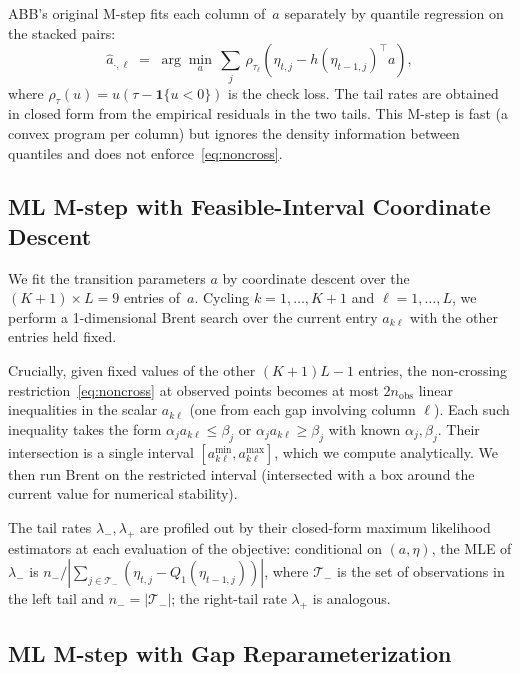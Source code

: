 \documentclass[12pt]{article}
\begin{document}
ABB's original M-step fits each column of~$a$ separately by quantile regression on the stacked pairs:
\[
\widehat{a}_{\cdot,\ell} \;=\; \arg\min_{a}\, \sum_{j}\, \rho_{\tau_{\ell}}\!\left(\eta_{t,j} - h(\eta_{t-1,j})^{\top} a\right),
\]
where $\rho_{\tau}(u) = u(\tau - \mathbf{1}\{u < 0\})$ is the check loss. The tail rates are obtained in closed form from the empirical residuals in the two tails. This M-step is fast (a convex program per column) but ignores the density information between quantiles and does not enforce~\eqref{eq:noncross}.

\subsection{ML M-step with Feasible-Interval Coordinate Descent}
\label{sec:approachA}

We fit the transition parameters $a$ by coordinate descent over the $(K+1) \times L = 9$ entries of~$a$. Cycling $k = 1, \dots, K+1$ and $\ell = 1, \dots, L$, we perform a 1-dimensional Brent search over the current entry $a_{k\ell}$ with the other entries held fixed.

Crucially, given fixed values of the other $(K+1) L - 1$ entries, the non-crossing restriction~\eqref{eq:noncross} at observed points becomes at most $2 n_{\mathrm{obs}}$ linear inequalities in the scalar $a_{k\ell}$ (one from each gap involving column $\ell$). Each such inequality takes the form $\alpha_{j} a_{k\ell} \leq \beta_{j}$ or $\alpha_{j} a_{k\ell} \geq \beta_{j}$ with known $\alpha_{j}, \beta_{j}$. Their intersection is a single interval $[a_{k\ell}^{\min}, a_{k\ell}^{\max}]$, which we compute analytically. We then run Brent on the restricted interval (intersected with a box around the current value for numerical stability).

The tail rates $\lambda_{-}, \lambda_{+}$ are profiled out by their closed-form maximum likelihood estimators at each evaluation of the objective: conditional on $(a, \eta)$, the MLE of $\lambda_{-}$ is $n_{-}/|\sum_{j\in\mathcal{T}_{-}} (\eta_{t,j} - Q_{1}(\eta_{t-1,j}))|$, where $\mathcal{T}_{-}$ is the set of observations in the left tail and $n_{-} = |\mathcal{T}_{-}|$; the right-tail rate $\lambda_{+}$ is analogous.

\subsection{ML M-step with Gap Reparameterization}
\label{sec:approachB}
\end{document}
